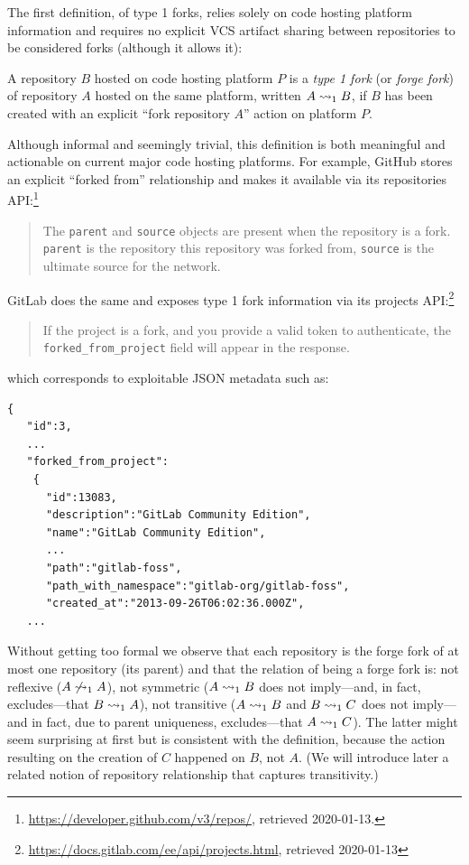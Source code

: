 The first definition, of type 1 forks, relies solely on code hosting platform
information and requires no explicit \gls{VCS} artifact sharing between
repositories to be considered forks (although it allows it):
\begin{definition}%
  \label{def:forge-fork}%
  \label{def:type1-fork}
  A repository $B$ hosted on code hosting platform $P$ is a \emph{type 1 fork}
  (or \emph{forge fork}) of repository $A$ hosted on the same platform, written
  $A\rightsquigarrow_1 B$, if $B$ has been created with an explicit ``fork repository
  $A$'' action on platform $P$.
\end{definition}

Although informal and seemingly trivial, this definition is both meaningful and
actionable on current major code hosting platforms. For example, GitHub stores
an explicit ``forked from'' relationship and makes it available via its
repositories API:\footnote{\url{https://developer.github.com/v3/repos/},
  retrieved 2020-01-13.}
\begin{quote}
  The \texttt{parent} and \texttt{source} objects are present when the
  repository is a fork. \texttt{parent} is the repository this repository was
  forked from, \texttt{source} is the ultimate source for the network.
\end{quote}
GitLab does the same and exposes type 1 fork information via its projects
API:\footnote{\url{https://docs.gitlab.com/ee/api/projects.html}, retrieved
  2020-01-13}
\begin{quote}
  If the project is a fork, and you provide a valid token to authenticate, the
  \texttt{forked\_from\_project} field will appear in the response.
\end{quote}
which corresponds to exploitable JSON metadata such as:

\begin{minipage}{0.96\linewidth}
\begin{verbatim}
{
   "id":3,
   ...
   "forked_from_project":
    {
      "id":13083,
      "description":"GitLab Community Edition",
      "name":"GitLab Community Edition",
      ...
      "path":"gitlab-foss",
      "path_with_namespace":"gitlab-org/gitlab-foss",
      "created_at":"2013-09-26T06:02:36.000Z",
   ...
\end{verbatim}
\end{minipage}

\vspace{1em}

Without getting too formal we observe that each repository is the forge fork of
at most one repository (its parent) and that the relation of being a forge fork
is: not reflexive ($A\not\rightsquigarrow_1 A$), not symmetric ($A\rightsquigarrow_1 B$ does not
imply---and, in fact, excludes---that $B\rightsquigarrow_1 A$), not transitive
($A\rightsquigarrow_1 B$ and $B\rightsquigarrow_1 C$ does not imply---and in fact, due to parent
uniqueness, excludes---that $A\rightsquigarrow_1 C$).  The latter might seem surprising
at first but is consistent with the definition, because the action resulting on
the creation of $C$ happened on $B$, not $A$.  (We will introduce later a
related notion of repository relationship that captures transitivity.)

